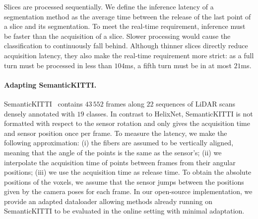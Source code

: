 \documentclass[runningheads]{tpls/llncs}
\begin{document}
Slices are processed sequentially. We define the inference latency of a segmentation method as the average time between the release of the last point of a slice and its segmentation. To meet the real-time requirement, inference must be faster than the acquisition of a slice. Slower processing would cause the classification to continuously fall behind.
Although thinner slices directly reduce acquisition latency, they also make the real-time requirement more strict: as a full turn must be processed in less than $104$ms, a fifth turn must be in at most $21$ms.

\paragraph{Adapting SemanticKITTI.}
SemanticKITTI~\cite{behley2019iccv,Geiger2013IJRR} contains  $43\,552$ frames along $22$ sequences of LiDAR scans densely annotated with $19$ classes. In contrast to HelixNet, SemanticKITTI is not formatted with respect to the sensor rotation and only gives the acquisition time and sensor position once per frame. To measure the latency, we make the following approximation:
(i) the fibers are assumed to be vertically aligned, meaning that the angle of the points is the same as the sensor's;
(ii) we interpolate the acquisition time of points between frames from their angular positions;
(iii) we use the acquisition time as release time.
To obtain the absolute positions of the voxels, we assume that the sensor jumps between the positions given by the camera poses for each frame. In our open-source implementation, we provide an adapted dataloader allowing methods already running on SemanticKITTI to be evaluated in the online setting with minimal adaptation.
\end{document}
